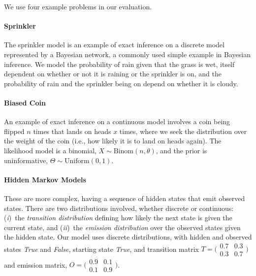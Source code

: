 \documentclass[sigconf,timestamp]{acmart}
\newcommand{\one}{({\em i})\/}
\newcommand{\two}{({\em ii})\/}
\begin{document}
We use four example problems in our evaluation.

\paragraph{Sprinkler}
The sprinkler model is an example of exact inference on a discrete model represented by a Bayesian network, %
a commonly used simple example in Bayesian inference. We model the probability of rain given that the grass is wet, itself dependent on whether or not it is raining or the sprinkler is on, and the probability of rain and the sprinkler being on depend on whether it is cloudy.

\paragraph{Biased Coin}
An example of exact inference on a continuous model involves a coin being flipped $n$ times that lands on heads $x$ times, where we seek the distribution over the weight of the coin (i.e., how likely it is to land on heads again). The likelihood model is a binomial, $X \sim \text{Binom}(n,\theta)$, and the prior is uninformative, $\Theta \sim \text{Uniform}(0,1)$.

\paragraph{Hidden Markov Models}
These are more complex, having a sequence of hidden states that emit observed states. There are two distributions involved, whether discrete or continuous: \one~the \emph{transition distribution} defining how likely the next state is given the current state, and \two~the \emph{emission distribution} over the observed states given the hidden state. Our model uses discrete distributions, with hidden and observed states \emph{True} and \emph{False}, starting state \emph{True}, and transition matrix
$T = \big(\begin{smallmatrix}
  0.7 & 0.3 \\
  0.3 & 0.7
\end{smallmatrix}\big)$
and emission matrix,
$O = \big(\begin{smallmatrix}
  0.9 & 0.1 \\
  0.1 & 0.9
\end{smallmatrix}\big)$.
\end{document}
